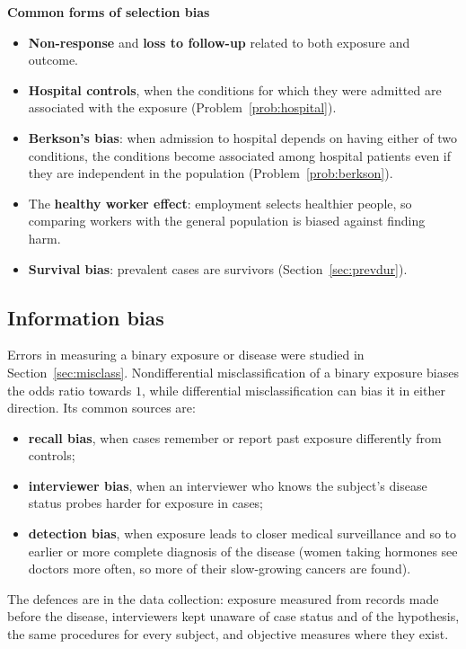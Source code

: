 \documentclass[11pt,a4paper]{article}
\numberwithin{equation}{section}
\theoremstyle{definition}
\newcommand{\subhead}[1]{%
  \par\medskip\noindent\textbf{#1}\par\nobreak\smallskip}
\begin{document}
\subhead{Common forms of selection bias}

\begin{itemize}
\item \textbf{Non-response} and \textbf{loss to follow-up} related to both exposure and outcome.
\item \textbf{Hospital controls}, when the conditions for which they were admitted are associated with the exposure
(Problem~\ref{prob:hospital}).
\item \textbf{Berkson's bias}: when admission to hospital depends on having either of two conditions, the conditions become associated
among hospital patients even if they are independent in the population (Problem~\ref{prob:berkson}).
\item The \textbf{healthy worker effect}: employment selects healthier people, so comparing workers with the general population is
biased against finding harm.
\item \textbf{Survival bias}: prevalent cases are survivors (Section~\ref{sec:prevdur}).
\end{itemize}

\subsection{Information bias}

Errors in measuring a binary exposure or disease were studied in Section~\ref{sec:misclass}. Nondifferential misclassification of a binary exposure biases the odds ratio towards $1$, while differential misclassification can bias it in either direction. Its common sources
are:
\begin{itemize}
\item \textbf{recall bias}, when cases remember or report past exposure differently from controls;
\item \textbf{interviewer bias}, when an interviewer who knows the subject's disease status probes harder for exposure in cases;
\item \textbf{detection bias}, when exposure leads to closer medical surveillance and so to earlier or more complete diagnosis of the
disease (women taking hormones see doctors more often, so more of their slow-growing cancers are found).
\end{itemize}
The defences are in the data collection: exposure measured from records made before the disease, interviewers kept unaware of case
status and of the hypothesis, the same procedures for every subject, and objective measures where they exist.
\end{document}
